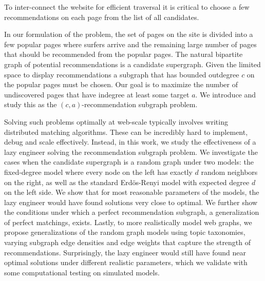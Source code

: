 To inter-connect the website for efficient
traversal it is critical to choose a few recommendations on each
page from the list of all candidates.

In our formulation of the problem, the set of pages on the site is
divided into a few popular pages where surfers arrive and the
remaining large number of pages that should be recommended from the
popular pages. The natural bipartite graph of potential
recommendations is a candidate supergraph. Given the limited space to
display recommendations a subgraph that has bounded outdegree $c$ on the
popular pages must be chosen. Our goal is to maximize the number of
undiscovered pages that have indegree at least some target $a$. We introduce and study this
as the $(c, a)$-recommendation subgraph problem.

Solving such problems optimally at web-scale typically involves
writing distributed matching algorithms.  These can be incredibly hard
to implement, debug and scale effectively.  Instead, in this work, we
study the effectiveness of a lazy engineer solving the recommendation
subgraph problem. We investigate the cases when the candidate
supergraph is a random graph under two models: the fixed-degree model
where every node on the left has exactly $d$ random neighbors on the
right, as well as the standard Erd\"{o}s-Renyi model with expected
degree $d$ on the left side. We show that for most reasonable
parameters of the models, the lazy engineer would have found solutions
very close to optimal. We further show the conditions under which a
perfect recommendation subgraph, a generalization of perfect
matchings, exists. Lastly, to more realistically model web graphs, we
propose generalizations of the random graph models using topic
taxonomies, varying subgraph edge densities and edge weights that
capture the strength of recommendations. Surprisingly, the lazy
engineer would still have found near optimal solutions under different
realistic parameters, which we validate with some computational
testing on simulated models.
\fi